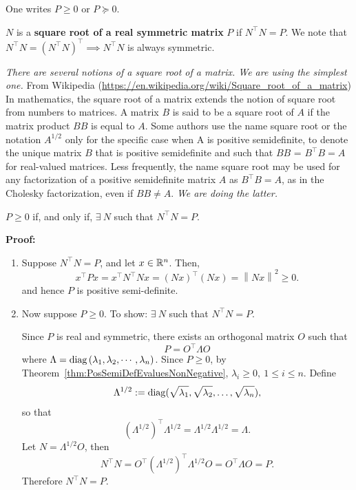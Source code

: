 \begin{notation}
One writes $P \geq 0$	or $P \succcurlyeq 0$.
\end{notation}

\begin{definition}
 $N$ is a \textbf{square root of a real symmetric matrix} $P$ if $N^\top N = P$. We note that $N^\top N = \left(N^\top N\right)^\top \implies N^\top N$ is always symmetric.
\end{definition}

\begin{rem} \emph{There are several notions of a square root of a matrix. We are using the simplest one.} From Wikipedia (\url{https://en.wikipedia.org/wiki/Square_root_of_a_matrix}) In mathematics, the square root of a matrix extends the notion of square root from numbers to matrices. A matrix $B$ is said to be a square root of $A$ if the matrix product $BB$ is equal to $A$. Some authors use the name square root or the notation $A^{1/2}$ only for the specific case when A is positive semidefinite, to denote the unique matrix $B$ that is positive semidefinite and such that $BB$ = $B^\top B = A$ for real-valued matrices. Less frequently, the name square root may be used for any factorization of a positive semidefinite matrix $A$ as $B^  \top B = A$, as in the Cholesky factorization, even if $BB \neq A$. \emph{We are doing the latter.}

\end{rem}

\begin{thm}
 $P\geq 0$ if, and only if, $ \exists ~N$ such that $N^\top N = P$.
\end{thm}
\textbf{Proof:}	
    \begin{enumerate}
        \item Suppose $N^\top N = P$, and let $x\in\mathbb R^n$. Then, 
            $$  x^\top P x = x^\top N^\top N x = (N x)^\top (N x) = \left\| N x \right\| ^2 \geq 0.$$
            and hence $P$ is positive semi-definite.
		\item Now suppose $P\geq 0$. To show: $\exists ~N$ such that $N^\top N = P$.

		Since $P$ is real and symmetric, there exists an orthogonal matrix $O$ such that
		$$ P = O^\top \Lambda O $$
		where $\Lambda = \operatorname*{\rm diag}\left(\lambda _1,\lambda_2, \dotsb, \lambda_n\right)$.         Since $P \geq 0$, by Theorem~\ref{thm:PosSemiDefEvaluesNonNegative}, $\lambda_i \geq 0,~ 1 \le i \le n$. Define 
		$$\Lambda ^{1/2} := \operatorname*{\rm diag}(\sqrt{\lambda_1}, \sqrt{\lambda_2}, \dots, \sqrt{\lambda_n}),$$
		so that
		$$ (\Lambda^{1/2})^\top \Lambda^{1/2} =\Lambda^{1/2} \Lambda^{1/2} = \Lambda.$$
        Let $N = \Lambda ^ {1/2} O $, then
		$$ N ^\top N = O^\top \left(\Lambda^{1/2}\right)^\top \Lambda^{1/2} O = O^\top \Lambda O = P.$$
Therefore $ N^\top N = P$. 
\Qed
    \end{enumerate}
		
